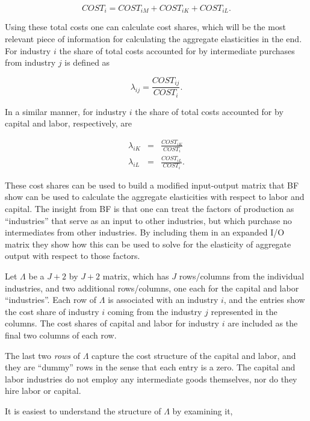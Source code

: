 \documentclass[11pt]{article}
\begin{document}
\begin{equation}
	COST_i = COST_{iM} + COST_{iK} + COST_{iL}. \label{EQ_costi}
\end{equation}

Using these total costs one can calculate cost shares, which will be the most relevant piece of information for calculating the aggregate elasticities in the end. For industry $i$ the share of total costs accounted for by intermediate purchases from industry $j$ is defined as

\begin{equation}
	\lambda_{ij} = \frac{COST_{ij}}{COST_i}. \label{EQ_lambdaij}
\end{equation}

In a similar manner, for industry $i$ the share of total costs accounted for by capital and labor, respectively, are

\begin{eqnarray}
	\lambda_{iK} &=& \frac{COST_{iK}}{COST_i} \\
	\lambda_{iL} &=& \frac{COST_{iL}}{COST_i}.
\end{eqnarray}

These cost shares can be used to build a modified input-output matrix that BF show can be used to calculate the aggregate elasticities with respect to labor and capital. The insight from BF is that one can treat the factors of production as ``industries'' that serve as an input to other industries, but which purchase no intermediates from other industries. By including them in an expanded I/O matrix they show how this can be used to solve for the elasticity of aggregate output with respect to those factors. 

Let $\Lambda$ be a $J+2$ by $J+2$ matrix, which has $J$ rows/columns from the individual industries, and two additional rows/columns, one each for the capital and labor ``industries''. Each row of $\Lambda$ is associated with an industry $i$, and the entries show the cost share of industry $i$ coming from the industry $j$ represented in the columns. The cost shares of capital and labor for industry $i$ are included as the final two columns of each row. 

The last two \textit{rows} of $\Lambda$ capture the cost structure of the capital and labor, and they are ``dummy'' rows in the sense that each entry is a zero. The capital and labor industries do not employ any intermediate goods themselves, nor do they hire labor or capital.

It is easiest to understand the structure of $\Lambda$ by examining it,
\end{document}

